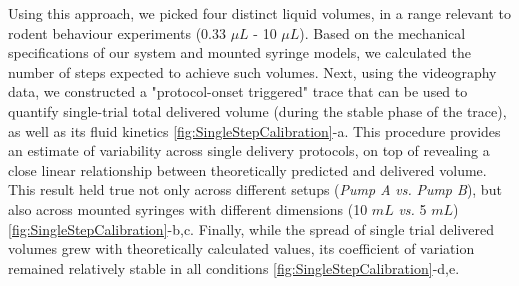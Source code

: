 Using this approach, we picked four distinct liquid volumes, in a range relevant to rodent behaviour experiments (0.33 $\mu L$ - 10 $\mu L$). Based on the mechanical specifications of our system and mounted syringe models, we calculated the number of steps expected to achieve such volumes. Next, using the videography data, we constructed a "protocol-onset triggered" trace that can be used to quantify single-trial total delivered volume (during the stable phase of the trace), as well as its fluid kinetics \cref{fig:SingleStepCalibration}-a. This procedure provides an estimate of variability across single delivery protocols, on top of revealing a close linear relationship between theoretically predicted and delivered volume. This result held true not only across different setups (\textit{Pump A} \textit{vs.} \textit{Pump B}), but also across mounted syringes with different dimensions (10 $mL$ \textit{vs.} 5 $mL$) \cref{fig:SingleStepCalibration}-b,c. Finally, while the spread of single trial delivered volumes grew with theoretically calculated values, its coefficient of variation remained relatively stable in all conditions \cref{fig:SingleStepCalibration}-d,e.


